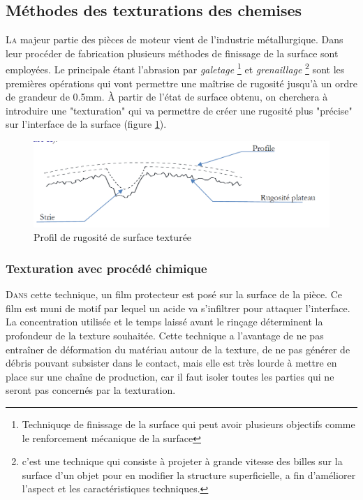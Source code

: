 \subsection{Méthodes des texturations des chemises}
\lettrine{L}{a} majeur partie des pièces de moteur vient de l'industrie métallurgique. Dans leur procéder de fabrication plusieurs méthodes de finissage de la surface sont employées. Le principale étant l'abrasion par \emph{galetage} \footnote{Techniquqe de finissage  de la surface qui peut avoir plusieurs objectifs comme le renforcement mécanique de la surface} et \emph{ grenaillage} \footnote{c'est une technique qui consiste à projeter à grande vitesse des billes sur la surface d'un objet pour en modifier la structure superficielle, a fin d'améliorer l'aspect et les caractéristiques techniques.} sont les premières opérations qui vont permettre une maîtrise de rugosité jusqu’à un ordre de grandeur de 0.5mm.\cite{ayad1} À partir de l’état de surface obtenu, on cherchera à introduire une "texturation" qui va permettre de créer une rugosité plus "précise" sur l’interface de la surface (figure \ref{fig:caracterisation}).
\begin{figure}[h]
	\centering
	\includegraphics[width=0.7\linewidth]{Img/caracterisation}
	\caption[surface texturée]{Profil de rugosité de surface texturée}
	\label{fig:caracterisation}
\end{figure}
\subsubsection{Texturation avec procédé chimique}
\lettrine{D}{ans} cette technique, un film protecteur est posé sur la surface de la pièce. Ce film est muni de motif par lequel un acide va s’infiltrer pour attaquer l’interface. La concentration utilisée et le temps laissé avant le rinçage déterminent la profondeur de la texture souhaitée. Cette technique a l’avantage de ne pas entraîner de déformation du matériau autour de la texture, de ne pas générer de débris pouvant subsister dans le contact, mais elle est très lourde à mettre en place sur une chaîne de production, car il faut isoler toutes les parties qui ne seront pas concernés par la texturation.
